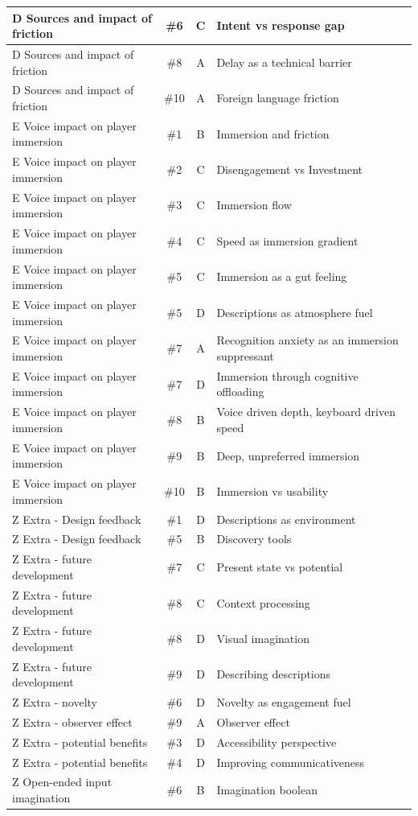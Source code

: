 \begin{longtable}{|p{}|c|c|>{\raggedright\arraybackslash}p{}|}
    D Sources and impact of friction & \#6 & C & Intent vs response gap \\ \hline
    D Sources and impact of friction & \#8 & A & Delay as a technical barrier \\ \hline
    D Sources and impact of friction & \#10 & A & Foreign language friction \\ \hline
    E Voice impact on player immersion & \#1 & B & Immersion and friction \\ \hline
    E Voice impact on player immersion & \#2 & C & Disengagement vs Investment \\ \hline
    E Voice impact on player immersion & \#3 & C & Immersion flow \\ \hline
    E Voice impact on player immersion & \#4 & C & Speed as immersion gradient \\ \hline
    E Voice impact on player immersion & \#5 & C & Immersion as a gut feeling \\ \hline
    E Voice impact on player immersion & \#5 & D & Descriptions as atmosphere fuel \\ \hline
    E Voice impact on player immersion & \#7 & A & Recognition anxiety as an immersion suppressant \\ \hline
    E Voice impact on player immersion & \#7 & D & Immersion through cognitive offloading \\ \hline
    E Voice impact on player immersion & \#8 & B & Voice driven depth, keyboard driven speed \\ \hline
    E Voice impact on player immersion & \#9 & B & Deep, unpreferred immersion \\ \hline
    E Voice impact on player immersion & \#10 & B & Immersion vs usability \\ \hline
    Z Extra - Design feedback & \#1 & D & Descriptions as environment \\ \hline
    Z Extra - Design feedback & \#5 & B & Discovery tools \\ \hline
    Z Extra - future development & \#7 & C & Present state vs potential \\ \hline
    Z Extra - future development & \#8 & C & Context processing \\ \hline
    Z Extra - future development & \#8 & D & Visual imagination \\ \hline
    Z Extra - future development & \#9 & D & Describing descriptions \\ \hline
    Z Extra - novelty & \#6 & D & Novelty as engagement fuel \\ \hline
    Z Extra - observer effect & \#9 & A & Observer effect \\ \hline
    Z Extra - potential benefits & \#3 & D & Accessibility perspective \\ \hline
    Z Extra - potential benefits & \#4 & D & Improving communicativeness \\ \hline
    Z Open-ended input imagination & \#6 & B & Imagination boolean \\ \hline
\end{longtable}




